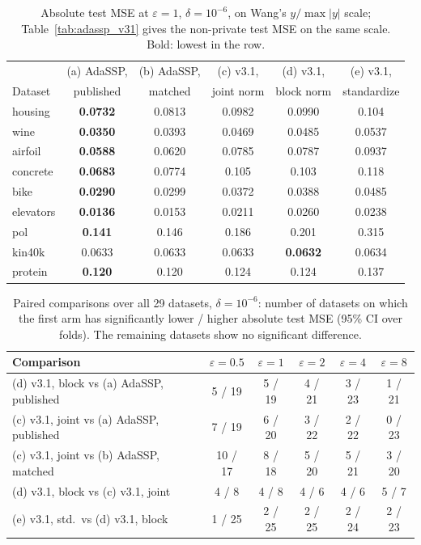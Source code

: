 \begin{table}[t]
  \centering
  \small
  \caption{Absolute test MSE at $\varepsilon = 1$, $\delta = 10^{-6}$, on Wang's $y/\max|y|$ scale; Table~\ref{tab:adassp_v31} gives the non-private test MSE on the same scale. Bold: lowest in the row.}
  \label{tab:adassp_abs_v31}
  \begin{tabular}{@{}lccccc@{}}
    \toprule
    & (a) AdaSSP, & (b) AdaSSP, & (c) v3.1, & (d) v3.1, & (e) v3.1, \\
    Dataset & published & matched & joint norm & block norm & standardize \\
    \midrule
    housing & \textbf{0.0732} & 0.0813 & 0.0982 & 0.0990 & 0.104 \\
    wine & \textbf{0.0350} & 0.0393 & 0.0469 & 0.0485 & 0.0537 \\
    airfoil & \textbf{0.0588} & 0.0620 & 0.0785 & 0.0787 & 0.0937 \\
    concrete & \textbf{0.0683} & 0.0774 & 0.105 & 0.103 & 0.118 \\
    bike & \textbf{0.0290} & 0.0299 & 0.0372 & 0.0388 & 0.0485 \\
    elevators & \textbf{0.0136} & 0.0153 & 0.0211 & 0.0260 & 0.0238 \\
    pol & \textbf{0.141} & 0.146 & 0.186 & 0.201 & 0.315 \\
    kin40k & 0.0633 & 0.0633 & 0.0633 & \textbf{0.0632} & 0.0634 \\
    protein & \textbf{0.120} & 0.120 & 0.124 & 0.124 & 0.137 \\
    \bottomrule
  \end{tabular}
\end{table}

\begin{table}[t]
  \centering
  \small
  \caption{Paired comparisons over all 29 datasets, $\delta = 10^{-6}$: number of datasets on which the first arm has significantly lower / higher absolute test MSE (95\% CI over folds). The remaining datasets show no significant difference.}
  \label{tab:verdicts_v31}
  \begin{tabular}{@{}lccccc@{}}
    \toprule
    Comparison & $\varepsilon = 0.5$ & $\varepsilon = 1$ & $\varepsilon = 2$ & $\varepsilon = 4$ & $\varepsilon = 8$ \\
    \midrule
    (d) v3.1, block vs (a) AdaSSP, published & 5 / 19 & 5 / 19 & 4 / 21 & 3 / 23 & 1 / 21 \\
    (c) v3.1, joint vs (a) AdaSSP, published & 7 / 19 & 6 / 20 & 3 / 22 & 2 / 22 & 0 / 23 \\
    (c) v3.1, joint vs (b) AdaSSP, matched & 10 / 17 & 8 / 18 & 5 / 20 & 5 / 21 & 3 / 20 \\
    (d) v3.1, block vs (c) v3.1, joint & 4 / 8 & 4 / 8 & 4 / 6 & 4 / 6 & 5 / 7 \\
    (e) v3.1, std.\ vs (d) v3.1, block & 1 / 25 & 2 / 25 & 2 / 25 & 2 / 24 & 2 / 23 \\
    \bottomrule
  \end{tabular}
\end{table}

